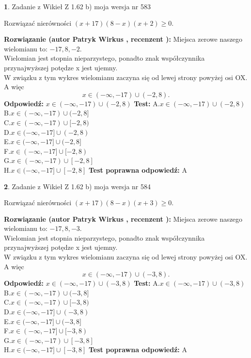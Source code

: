 \documentclass[12pt, a4paper]{article}
\theoremstyle{definition} %
\newtheorem{zad}{}
\newcommand{\zadStart}[1]{\begin{zad}#1\newline}
\newcommand{\zadStop}{\end{zad}}
\newcommand{\rozwStart}[2]{\noindent \textbf{Rozwiązanie (autor #1 , recenzent #2): }\newline}
\newcommand{\rozwStop}{\newline}
\newcommand{\odpStart}{\noindent \textbf{Odpowiedź:}\newline}
\newcommand{\odpStop}{\newline}
\newcommand{\testStart}{\noindent \textbf{Test:}\newline}
\newcommand{\testStop}{\newline}
\newcommand{\kluczStart}{\noindent \textbf{Test poprawna odpowiedź:}\newline}
\newcommand{\kluczStop}{\newline}
\begin{document}
\zadStart{Zadanie z Wikieł Z 1.62 b) moja wersja nr 583}

Rozwiązać nierówności $(x+17)(8-x)(x+2)\ge0$.
\zadStop
\rozwStart{Patryk Wirkus}{}
Miejsca zerowe naszego wielomianu to: $-17, 8, -2$.\\
Wielomian jest stopnia nieparzystego, ponadto znak współczynnika przy\linebreak najwyższej potędze x jest ujemny.\\ W związku z tym wykres wielomianu zaczyna się od lewej strony powyżej osi OX. A więc $$x \in (-\infty,-17) \cup (-2,8).$$
\rozwStop
\odpStart
$x \in (-\infty,-17) \cup (-2,8)$
\odpStop
\testStart
A.$x \in (-\infty,-17) \cup (-2,8)$\\
B.$x \in (-\infty,-17) \cup (-2,8]$\\
C.$x \in (-\infty,-17) \cup [-2,8)$\\
D.$x \in (-\infty,-17] \cup (-2,8)$\\
E.$x \in (-\infty,-17] \cup (-2,8]$\\
F.$x \in (-\infty,-17] \cup [-2,8)$\\
G.$x \in (-\infty,-17) \cup [-2,8]$\\
H.$x \in (-\infty,-17] \cup [-2,8]$
\testStop
\kluczStart
A
\kluczStop



\zadStart{Zadanie z Wikieł Z 1.62 b) moja wersja nr 584}

Rozwiązać nierówności $(x+17)(8-x)(x+3)\ge0$.
\zadStop
\rozwStart{Patryk Wirkus}{}
Miejsca zerowe naszego wielomianu to: $-17, 8, -3$.\\
Wielomian jest stopnia nieparzystego, ponadto znak współczynnika przy\linebreak najwyższej potędze x jest ujemny.\\ W związku z tym wykres wielomianu zaczyna się od lewej strony powyżej osi OX. A więc $$x \in (-\infty,-17) \cup (-3,8).$$
\rozwStop
\odpStart
$x \in (-\infty,-17) \cup (-3,8)$
\odpStop
\testStart
A.$x \in (-\infty,-17) \cup (-3,8)$\\
B.$x \in (-\infty,-17) \cup (-3,8]$\\
C.$x \in (-\infty,-17) \cup [-3,8)$\\
D.$x \in (-\infty,-17] \cup (-3,8)$\\
E.$x \in (-\infty,-17] \cup (-3,8]$\\
F.$x \in (-\infty,-17] \cup [-3,8)$\\
G.$x \in (-\infty,-17) \cup [-3,8]$\\
H.$x \in (-\infty,-17] \cup [-3,8]$
\testStop
\kluczStart
A
\kluczStop
\end{document}

